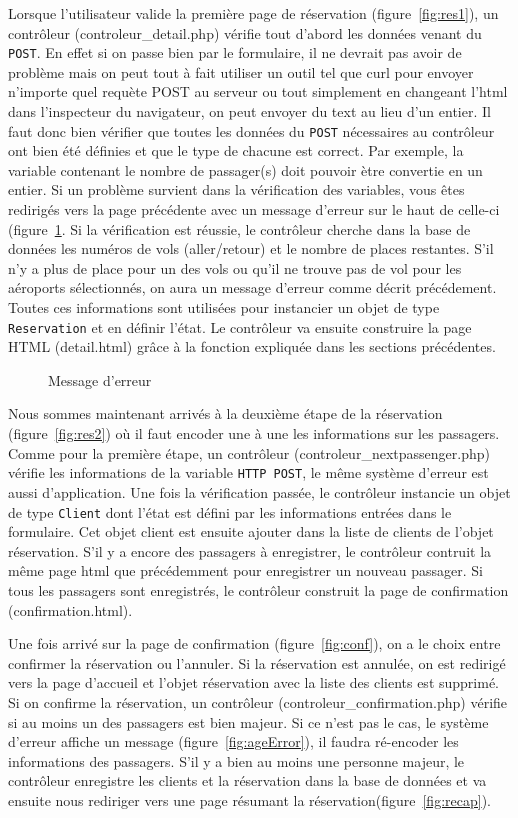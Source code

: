 \documentclass[12pt,a4paper]{article}
\begin{document}
			Lorsque l'utilisateur valide la première page de réservation (figure~\ref{fig:res1}), un contrôleur (controleur\_detail.php) vérifie tout d'abord les données venant du \texttt{POST}. En effet si on passe bien par le formulaire, il ne devrait pas avoir de problème mais on peut tout à fait utiliser un outil tel que curl pour envoyer n'importe quel requète POST au serveur ou tout simplement en changeant l'html dans l'inspecteur du navigateur, on peut envoyer du text au lieu d'un entier. Il faut donc bien vérifier que toutes les données du \texttt{POST} nécessaires au contrôleur ont bien été définies et que le type de chacune est correct. Par exemple, la variable contenant le nombre de passager(s) doit pouvoir ètre convertie en un entier. Si un problème survient dans la vérification des variables, vous êtes redirigés vers la page précédente avec un message d'erreur sur le haut de celle-ci (figure~\ref{fig:error}. Si la vérification est réussie, le contrôleur cherche dans la base de données les numéros de vols (aller/retour) et le nombre de places restantes. S'il n'y a plus de place pour un des vols ou qu'il ne trouve pas de vol pour les aéroports sélectionnés, on aura un message d'erreur comme décrit précédement. Toutes ces informations sont utilisées pour instancier un objet de type \texttt{Reservation} et en définir l'état. Le contrôleur va ensuite construire la page HTML (detail.html) grâce à la fonction expliquée dans les sections précédentes.
			\begin{figure}
				\caption{Message d'erreur}
				\label{fig:error}
			\end{figure}


			Nous sommes maintenant arrivés à la deuxième étape de la réservation (figure~\ref{fig:res2}) où il faut encoder une à une les informations sur les passagers. Comme pour la première étape, un contrôleur (controleur\_nextpassenger.php) vérifie les informations de la variable \texttt{HTTP POST}, le même système d'erreur est aussi d'application. Une fois la vérification passée, le contrôleur instancie un objet de type \texttt{Client} dont l'état est défini par les informations entrées dans le formulaire. Cet objet client est ensuite ajouter dans la liste de clients de l'objet réservation. S'il y a encore des passagers à enregistrer, le contrôleur contruit la même page html que précédemment pour enregistrer un nouveau passager. Si tous les passagers sont enregistrés, le contrôleur construit la page de confirmation (confirmation.html).

			Une fois arrivé sur la page de confirmation (figure~\ref{fig:conf}), on a le choix entre confirmer la réservation ou l'annuler. Si la réservation est annulée, on est redirigé vers la page d'accueil et l'objet réservation avec la liste des clients est supprimé. Si on confirme la réservation, un contrôleur (controleur\_confirmation.php) vérifie si au moins un des passagers est bien majeur. Si ce n'est pas le cas, le système d'erreur affiche un message (figure~\ref{fig:ageError}), il faudra ré-encoder les informations des passagers. S'il y a bien au moins une personne majeur, le contrôleur enregistre les clients et la réservation dans la base de données et va ensuite nous rediriger vers une page résumant la réservation(figure~\ref{fig:recap}).
\end{document}
